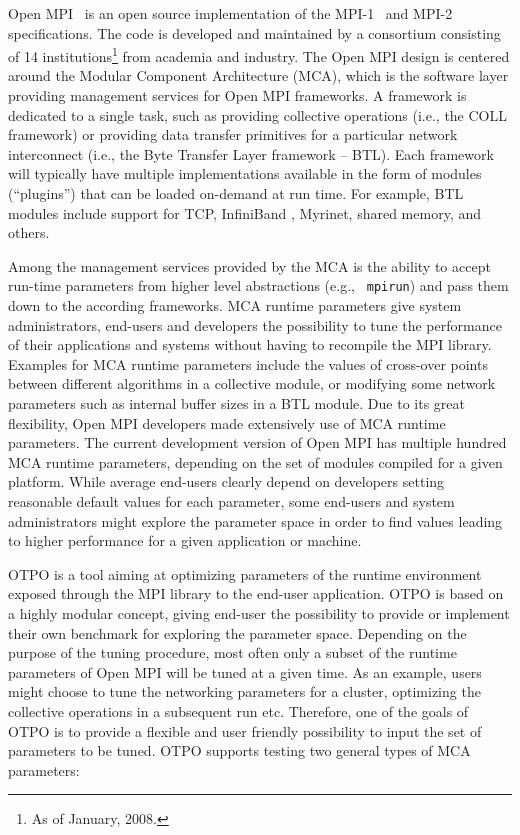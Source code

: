 Open MPI~\cite{gabriel:ompi} is an open source implementation of the
MPI-1~\cite{mpi1} and MPI-2~\cite{mpi2} specifications. The code is
developed and maintained by a consortium consisting of 14
institutions\footnote{As of January, 2008.} from academia and
industry. The Open MPI design is centered around the Modular Component
Architecture (MCA), which is the software layer providing management
services for Open MPI frameworks. A framework is dedicated to a single
task, such as providing collective operations (i.e., the COLL
framework) or providing data transfer primitives for a particular
network interconnect (i.e., the Byte Transfer Layer framework --
BTL). Each framework will typically have multiple implementations
available in the form of modules (``plugins'') that can be loaded
on-demand at run time.  For example, BTL modules include support for
TCP, InfiniBand%
, Myrinet, shared memory, and others.

Among the management services provided by the MCA is the ability to
accept run-time parameters from higher level abstractions (e.g., {\tt
  mpirun}) and pass them down to the according frameworks. MCA runtime
parameters give system administrators, end-users and developers the
possibility to tune the performance of their applications and systems
without having to recompile the MPI library. Examples for MCA runtime
parameters include the values of cross-over points between different
algorithms in a collective module, or modifying some network
parameters such as internal buffer sizes in a BTL module. Due to its
great flexibility, Open MPI developers made extensively use of MCA
runtime parameters.  The current development version of Open MPI has
multiple hundred MCA runtime parameters, depending on the set of
modules compiled for a given platform. While average end-users clearly
depend on developers setting reasonable default values for each
parameter, some end-users and system administrators might explore the
parameter space in order to find values leading to higher performance
for a given application or machine.

OTPO is a tool aiming at optimizing parameters of the runtime environment
exposed through the MPI library to the end-user application. OTPO is based on
a highly modular concept, giving end-user the possibility to provide or
implement their own benchmark for exploring the parameter space. Depending on
the purpose of the tuning procedure, most often only a subset of the runtime
parameters of Open MPI will be tuned at a given time. As an example, users
might choose to tune the networking parameters for a cluster, optimizing the
collective operations in a subsequent run etc. Therefore, one of the goals of
OTPO is to provide a flexible and user friendly possibility to input the set
of parameters to be tuned. 
OTPO supports testing two general types of MCA parameters:

